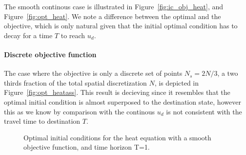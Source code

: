 \documentclass[10pt]{article}
\begin{document}
The smooth continous case is illustrated in Figure~\ref{fig:ic_obj_heat}, and Figure~\ref{fig:opt_heat}. We note a difference between the optimal and the objective, which is only natural given that the initial optimal condition has to decay for a time $T$ to reach $u_d$.

\paragraph{Discrete objective function}
The case where the objective is only a discrete set of points $N_s=2 N/3$, a two thirds fraction of the total spatial discretization $N$, is depicted in Figure~\ref{fig:opt_heatass}. This result is decieving since it resembles that the optimal initial condition is almost superposed to the destination state, however this as we know by comparison with the continous $u_d$ is not consistent with the travel time to destination $T$.    

\begin{figure}[!ht]
\centering
{}
\quad
{}
\caption{Optimal initial conditions for the heat equation with a smooth objective function, and time horizon T=1.}
\end{figure}
\end{document}
